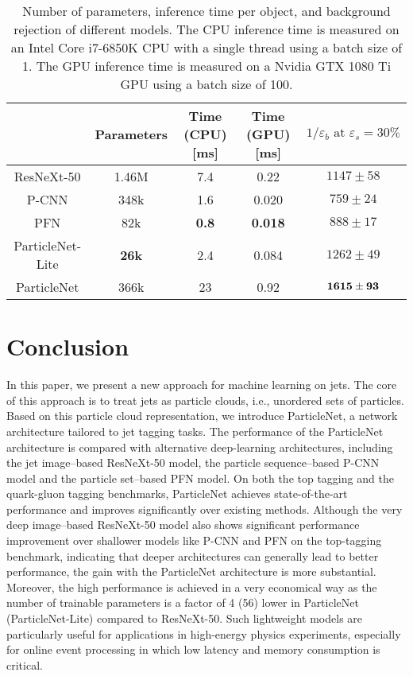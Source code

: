 \documentclass[aps,prd,longbibliography,reprint,amsmath,amssymb,amsfonts]{revtex4-1}
\begin{document}
\begin{table*}[htbp]
\centering
\caption{Number of parameters, inference time per object, and background rejection of different models. The CPU inference time is measured on an Intel Core i7-6850K CPU with a single thread using a batch size of 1. The GPU inference time is measured on a Nvidia GTX 1080 Ti GPU using a batch size of 100.}
\label{tab:model-size}
\begin{ruledtabular}
\begin{tabular}{ccccc}
                       & Parameters & Time (CPU) [ms] & Time (GPU) [ms] & $1/\varepsilon_{b}\text{ at }\varepsilon_{s}=30\%$ \\
    \hline
    ResNeXt-50         & 1.46M     & 7.4          & 0.22       & $1147\pm58$       \\
    P-CNN              & 348k      & 1.6          & 0.020      & $759\pm24$        \\
    PFN                & 82k       & \bf 0.8      & \bf 0.018  & $888\pm17$        \\
    ParticleNet-Lite   & \bf 26k   & 2.4          & 0.084      & $1262\pm49$       \\
    ParticleNet        & 366k      & 23           & 0.92       & $\bf 1615\pm93$   \\
\end{tabular}
\end{ruledtabular}
\end{table*}

 \section{Conclusion}
\label{sec:conclusion}


In this paper, we present a new approach for machine learning on jets. The core of this approach is to treat jets as particle clouds, i.e., unordered sets of particles. Based on this particle cloud representation, we introduce ParticleNet, a network architecture tailored to jet tagging tasks. The performance of the ParticleNet architecture is compared with alternative deep-learning architectures, including the jet image--based ResNeXt-50 model, the particle sequence--based P-CNN model and the particle set--based PFN model.  On both the top tagging and the quark-gluon tagging benchmarks, ParticleNet achieves state-of-the-art performance and improves significantly over existing methods. Although the very deep image--based ResNeXt-50 model also shows significant performance improvement over shallower models like P-CNN and PFN on the top-tagging benchmark, indicating that deeper architectures can generally lead to better performance, the gain with the ParticleNet architecture is more substantial. Moreover, the high performance is achieved in a very economical way as the number of trainable parameters is a factor of 4 (56) lower in ParticleNet (ParticleNet-Lite) compared to ResNeXt-50. Such lightweight models are particularly useful for applications in high-energy physics experiments, especially for online event processing in which low latency and memory consumption is critical. 
\end{document}
